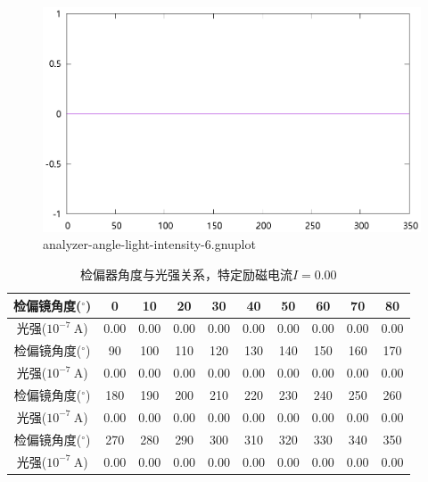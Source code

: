 \documentclass{ctexart}
\newcommand{\si}[1]{\  \mathrm{#1}}
\begin{document}
    \begin{figure}[H]
      \centering
      \includegraphics[width=\linewidth]{../output/analyzer-angle-light-intensity-6.gnuplot}
      \caption{analyzer-angle-light-intensity-6.gnuplot}
      \label{fig:analyzer-angle-light-intensity-6.gnuplot}
    \end{figure}
    \begin{table}[H]
      \centering
      \begin{tabular}{|c|c|c|c|c|c|c|c|c|c|}
        \hline
        检偏镜角度(${}^{\circ}$) & 0 & 10 & 20 & 30 & 40 & 50 & 60 & 70 & 80 \\\hline
        光强($10^{-7} \si{A}$)  & 0.00 & 0.00 & 0.00 & 0.00 & 0.00 & 0.00 & 0.00 & 0.00 & 0.00 \\\hline
        检偏镜角度(${}^{\circ}$) & 90 & 100 & 110 & 120 & 130 & 140 & 150 & 160 & 170 \\\hline
        光强($10^{-7} \si{A}$)  & 0.00 & 0.00 & 0.00 & 0.00 & 0.00 & 0.00 & 0.00 & 0.00 & 0.00  \\\hline
        检偏镜角度(${}^{\circ}$) & 180 & 190 & 200 & 210 & 220 & 230 & 240 & 250 & 260  \\\hline
        光强($10^{-7} \si{A}$)  & 0.00 & 0.00 & 0.00 & 0.00 & 0.00 & 0.00 & 0.00 & 0.00 & 0.00 \\\hline
        检偏镜角度(${}^{\circ}$) & 270 & 280 & 290 & 300 & 310 & 320 & 330 & 340 & 350 \\\hline
        光强($10^{-7} \si{A}$)  & 0.00 & 0.00 & 0.00 & 0.00 & 0.00 & 0.00 & 0.00 & 0.00 & 0.00 \\\hline
      \end{tabular}
      \caption{检偏器角度与光强关系，特定励磁电流$I=0.00$}
    \end{table}
\end{document}
